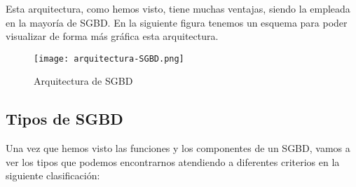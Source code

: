 Esta arquitectura, como hemos visto, tiene muchas ventajas, siendo la empleada en la mayoría de SGBD. En la siguiente figura tenemos un esquema para poder visualizar de forma más gráfica esta arquitectura.

\begin{figure}[ht]
    \centering
    \texttt{[image: arquitectura-SGBD.png]}
    \caption{Arquitectura de SGBD}
\end{figure}

\subsection{Tipos de SGBD}
Una vez que hemos visto las funciones y los componentes de un SGBD, vamos a ver los tipos que podemos encontrarnos atendiendo a diferentes criterios en la siguiente clasificación:

